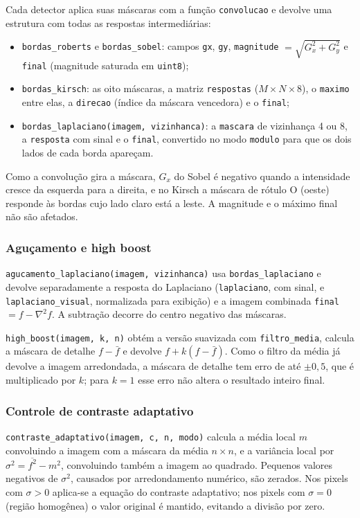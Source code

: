 \documentclass[11pt,a4paper]{article}
\begin{document}
Cada detector aplica suas máscaras com a função \texttt{convolucao} e devolve uma estrutura com todas as respostas intermediárias:
\begin{itemize}
  \item \texttt{bordas\_roberts} e \texttt{bordas\_sobel}: campos \texttt{gx}, \texttt{gy}, \texttt{magnitude} $=\sqrt{G_x^2+G_y^2}$ e \texttt{final} (magnitude saturada em \texttt{uint8});
  \item \texttt{bordas\_kirsch}: as oito máscaras, a matriz \texttt{respostas} ($M\times N\times 8$), o \texttt{maximo} entre elas, a \texttt{direcao} (índice da máscara vencedora) e o \texttt{final};
  \item \texttt{bordas\_laplaciano(imagem, vizinhanca)}: a \texttt{mascara} de vizinhança 4 ou 8, a \texttt{resposta} com sinal e o \texttt{final}, convertido no modo \texttt{modulo} para que os dois lados de cada borda apareçam.
\end{itemize}
Como a convolução gira a máscara, $G_x$ do Sobel é negativo quando a intensidade cresce da esquerda para a direita, e no Kirsch a máscara de rótulo O (oeste) responde às bordas cujo lado claro está a leste. A magnitude e o máximo final não são afetados.

\subsubsection{Aguçamento e high boost}

\texttt{agucamento\_laplaciano(imagem, vizinhanca)} usa \texttt{bordas\_laplaciano} e devolve separadamente a resposta do Laplaciano (\texttt{laplaciano}, com sinal, e \texttt{laplaciano\_visual}, normalizada para exibição) e a imagem combinada \texttt{final} $= f - \nabla^2 f$. A subtração decorre do centro negativo das máscaras.

\texttt{high\_boost(imagem, k, n)} obtém a versão suavizada com \texttt{filtro\_media}, calcula a máscara de detalhe $f-\bar f$ e devolve $f + k(f-\bar f)$. Como o filtro da média já devolve a imagem arredondada, a máscara de detalhe tem erro de até $\pm0{,}5$, que é multiplicado por $k$; para $k=1$ esse erro não altera o resultado inteiro final.

\subsubsection{Controle de contraste adaptativo}

\texttt{contraste\_adaptativo(imagem, c, n, modo)} calcula a média local $m$ convoluindo a imagem com a máscara da média $n\times n$, e a variância local por $\sigma^2 = \overline{f^2} - m^2$, convoluindo também a imagem ao quadrado. Pequenos valores negativos de $\sigma^2$, causados por arredondamento numérico, são zerados. Nos pixels com $\sigma>0$ aplica-se a equação do contraste adaptativo; nos pixels com $\sigma=0$ (região homogênea) o valor original é mantido, evitando a divisão por zero.
\end{document}
